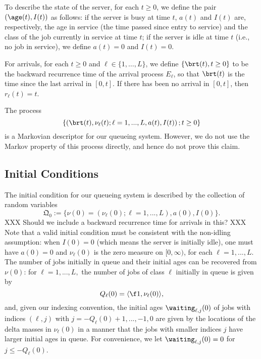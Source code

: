 \documentclass{article}
\begin{document}
To describe the state of the server, for each $t\geq 0$, we define the pair $(\age(t),I(t))$ as follows: if the server is busy at time $t$, $a(t)$ and $I(t)$ are, respectively, the age in service (the time passed since entry to service) and the class of the job currently in service at time $t$; if the server is idle at time $t$ (i.e., no job in service), we define $a(t)=0$ and $I(t)=0$. 

For arrivals, for each $t\geq 0$ and $\ell \in \{ 1, \ldots, L\}$, we define $\{\brt(t),t\geq0\}$ to be the backward recurrence time of the arrival process $E_\ell$, so that $\brt(t)$ is the time since the last arrival in $[0,t]$.  If there has been no arrival in $[0,t]$, then $r_\ell(t) =t$.

The process
\[
\{\left( \brt(t), \nu_\ell(t);\ell=1,...,L,a(t),I(t) \right);t\geq0\}
\]
is a Markovian descriptor for our queueing system. However,  we do not use the Markov property of this process directly, and hence do not prove this claim.


\subsection{Initial Conditions\label{initialconditions}}
The initial condition for our queueing system is described by the collection of random variables
\begin{equation}\label{ic}
\mathfrak{Q}_0:=\{\nu(0)=(\nu_\ell(0);\ell=1,...,L),a(0),I(0)\}.
\end{equation}
XXX Should we include a backward recurrence time for arrivals   in this? XXX
Note that a valid initial condition must be consistent with the non-idling assumption: when $I(0)=0$ (which means the server is initially idle), one must have $a(0)=0$ and $\nu_\ell(0)$ is the zero measure on $[0, \infty)$,  for each $\ell=1,...,L$. The number of jobs initially in queue and their initial ages can be recovered from $\nu(0)$: for $\ell=1,...,L,$ the number of jobs of class $\ell$ initially in queue is given by 
\begin{equation}\label{QLzero}
Q_\ell(0)=\langle\f1,\nu_\ell(0) \rangle,
\end{equation}
and, given our indexing convention, the initial ages $\waiting_{\ell,j}(0)$ of jobs with indices $(\ell,j)$ with $j=-Q_\ell(0)+1,...,-1,0$ are given by the locations of the delta masses in $\nu_\ell(0)$ in a manner that the jobs with smaller indices $j$ have larger initial ages in queue. For convenience, we let $\waiting_{\ell,j}(0)=0$ for $j\leq -Q_\ell(0)$.
\end{document}
